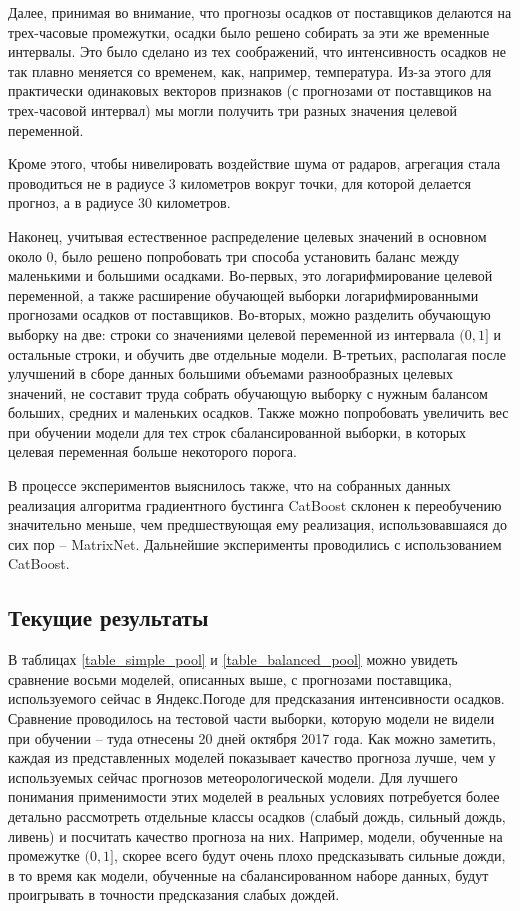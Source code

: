 \documentclass[14pt]{matmex-diploma}
\begin{document}
Далее, принимая во внимание, что прогнозы осадков от поставщиков делаются на трех-часовые промежутки, осадки было решено собирать за эти же временные интервалы. Это было сделано из тех соображений, что интенсивность осадков не так плавно меняется со временем, как, например, температура. Из-за этого для практически одинаковых векторов признаков (с прогнозами от поставщиков на трех-часовой интервал) мы могли получить три разных значения целевой переменной.

Кроме этого, чтобы нивелировать воздействие шума от радаров, агрегация стала проводиться не в радиусе 3 километров вокруг точки, для которой делается прогноз, а в радиусе 30 километров.

Наконец, учитывая естественное распределение целевых значений в основном около 0, было решено попробовать три способа установить баланс между маленькими и большими осадками. Во-первых, это логарифмирование целевой переменной, а также расширение обучающей выборки логарифмированными прогнозами осадков от поставщиков. Во-вторых, можно разделить обучающую выборку на две: строки со значениями целевой переменной из интервала $(0, 1]$ и остальные строки, и обучить две отдельные модели. В-третьих, располагая после улучшений в сборе данных большими объемами разнообразных целевых значений, не составит труда собрать обучающую выборку с нужным балансом больших, средних и маленьких осадков. Также можно попробовать увеличить вес при обучении модели для тех строк сбалансированной выборки, в которых целевая переменная больше некоторого порога.

В процессе экспериментов выяснилось также, что на собранных данных реализация алгоритма градиентного бустинга CatBoost склонен к переобучению значительно меньше, чем предшествующая ему реализация, использовавшаяся до сих пор -- MatrixNet. Дальнейшие эксперименты проводились с использованием CatBoost.


\subsection{Текущие результаты}

В таблицах \ref{table_simple_pool} и \ref{table_balanced_pool} можно увидеть сравнение восьми моделей, описанных выше, с прогнозами поставщика, используемого сейчас в Яндекс.Погоде для предсказания интенсивности осадков. Сравнение проводилось на тестовой части выборки, которую модели не видели при обучении -- туда отнесены 20 дней октября 2017 года. Как можно заметить, каждая из представленных моделей показывает качество прогноза лучше, чем у используемых сейчас прогнозов метеорологической модели. Для лучшего понимания применимости этих моделей в реальных условиях потребуется более детально рассмотреть отдельные классы осадков (слабый дождь, сильный дождь, ливень) и посчитать качество прогноза на них. Например, модели, обученные на промежутке $(0, 1]$, скорее всего будут очень плохо предсказывать сильные дожди, в то время как модели, обученные на сбалансированном наборе данных, будут проигрывать в точности предсказания слабых дождей.
\end{document}
